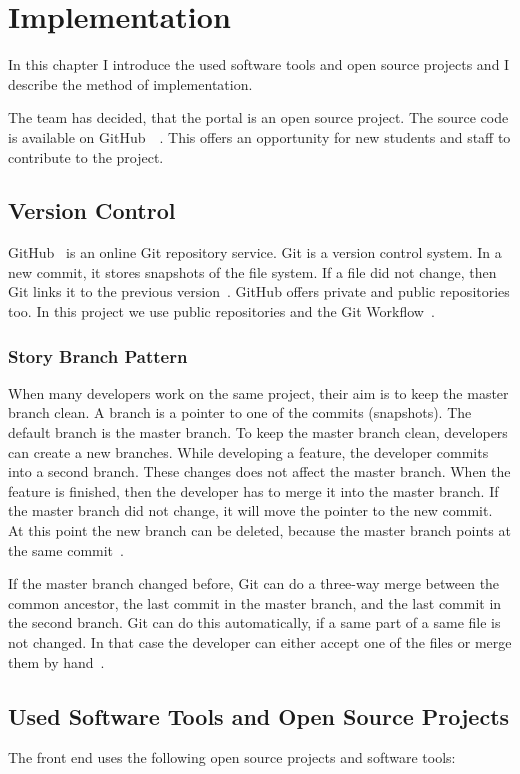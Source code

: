 \chapter{Implementation}\label{implementation}

In this chapter I introduce the used software tools and open source projects and I describe the method of implementation.

The team has decided, that the portal is an open source project. The source code is available on GitHub~\cite{Github-student-frontend}~\cite{Github-backend}. This offers an opportunity for new students and staff to contribute to the project. 

\section{Version Control}
GitHub~\cite{github} is an online Git repository service. Git is a version control system. In a new commit, it stores snapshots of the file system. If a file did not change, then Git links it to the previous version~\cite{git}. GitHub offers private and public repositories too. In this project we use public repositories and the Git Workflow~\cite{git-workflow}. 

\subsection{Story Branch Pattern}
When many developers work on the same project, their aim is to keep the master branch clean. A branch is a pointer to one of the commits (snapshots). The default branch is the master branch. To keep the master branch clean, developers can create a new branches. While developing a feature, the developer commits into a second branch. These changes does not affect the master branch. When the feature is finished, then the developer has to merge it into the master branch. If the master branch did not change, it will move the pointer to the new commit. At this point the new branch can be deleted, because the master branch points at the same commit~\cite{git-workflow2}.

If the master branch changed before, Git can do a three-way merge between the common ancestor, the last commit in the master branch, and the last commit in the second branch. Git can do this automatically, if a same part of a same file is not changed. In that case the developer can either accept one of the files or merge them by hand~\cite{git-workflow2}.

\section{Used Software Tools and Open Source Projects}
The front end uses the following open source projects and software tools:

